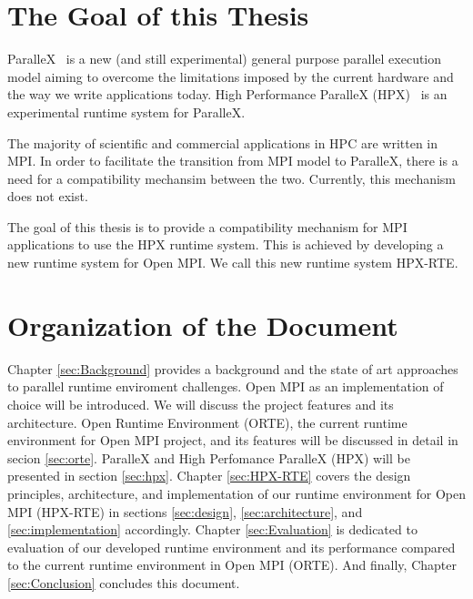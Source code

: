 \section{The Goal of this Thesis}
ParalleX~\cite{4228212} is a new (and still experimental) general purpose parallel execution model aiming to overcome the limitations imposed by the current hardware and the way we write applications today. High Performance ParalleX (HPX)~\cite{Kaiser:2014:HTB:2676870.2676883} is an experimental runtime system for ParalleX.

The majority of scientific and commercial applications in HPC are written in MPI. In order to facilitate the transition from MPI model to ParalleX, there is a need for a compatibility mechansim between the two. Currently, this mechanism does not exist.

The goal of this thesis is to provide a compatibility mechanism for MPI applications to use the HPX runtime system. This is achieved by developing a new runtime system for Open MPI. We call this new runtime system HPX-RTE.

\section{Organization of the Document}
Chapter \ref{sec:Background} provides a background and the state of art approaches to parallel runtime enviroment challenges. Open MPI as an implementation of choice will be introduced. We will discuss the project features and its architecture. Open Runtime Environment (ORTE), the current runtime environment for Open MPI project, and its features will be discussed in detail in secion \ref{sec:orte}. ParalleX and High Perfomance ParalleX (HPX) will be presented in section \ref{sec:hpx}. Chapter \ref{sec:HPX-RTE} covers the design principles, architecture, and implementation of our runtime environment for Open MPI (HPX-RTE) in sections \ref{sec:design}, \ref{sec:architecture}, and \ref{sec:implementation} accordingly. Chapter \ref{sec:Evaluation} is dedicated to evaluation of our developed runtime environment and its performance compared to the current runtime environment in Open MPI (ORTE). And finally, Chapter \ref{sec:Conclusion} concludes this document.
